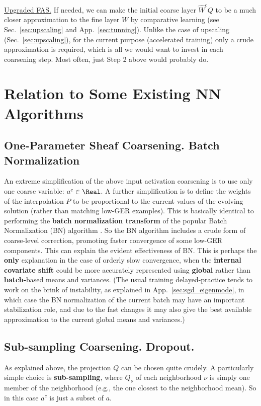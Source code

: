 \documentclass{article} %
\begin{document}
\underline{Upgraded FAS.} If needed, we can make the initial coarse layer $\hat{W}^c Q$ to be a much closer approximation to the fine layer $W$ by comparative learning (see Sec.~\ref{sec:upscaling} and App.~\ref{sec:tunning}). Unlike the case of upscaling (Sec.~\ref{sec:upscaling}), for the current purpose (accelerated training) only a crude approximation is required, which is all we would want to invest in each coarsening step. Most often, just Step 2 above would probably do.

\section{Relation to Some Existing NN Algorithms}
\label{sec:relation_existing}

\subsection{One-Parameter Sheaf Coarsening. Batch Normalization}
An extreme simplification of the above input activation coarsening is to use only one coarse variable: $a^c \in \Real$. A further simplification is to define the weights of the interpolation $P$ to be proportional to the current values of the evolving solution (rather than matching low-GER examples). This is basically identical to performing the \textbf{batch normalization transform} of the popular Batch Normalization (BN) algorithm \cite{bn}. So the BN algorithm includes a crude form of coarse-level correction, promoting faster convergence of some low-GER components. This can explain the evident effectiveness of BN. This is perhaps the \textbf{only} explanation in the case of orderly slow convergence, when the \textbf{internal covariate shift} could be more accurately represented using \textbf{global} rather than \textbf{batch-}based means and variances. (The usual training delayed-practice tends to work on the brink of instability, as explained in App.~\ref{sec:sgd_eigenmode}, in which case the BN normalization of the current batch may have an important stabilization role, and due to the fast changes it may also give the best available approximation to the current global means and variances.)

\subsection{Sub-sampling Coarsening. Dropout.}
As explained above, the projection $Q$ can be chosen quite crudely. A particularly simple choice is \textbf{sub-sampling}, where $Q_{\nu}$ of each neighborhood $\nu$ is simply one member of the neighborhood (e.g., the one closest to the neighborhood mean). So in this case $a^c$ is just a subset of $a$.
\end{document}
